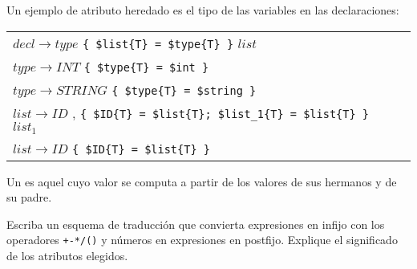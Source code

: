 \begin{example}
\label{example:typesandts}
Un ejemplo de atributo heredado es el tipo de las variables en las declaraciones:

\vspace{0.5cm}
\begin{tabular}{ll}
$decl   \rightarrow type$ \verb|{ $list{T} = $type{T} }| $list$\\
$type   \rightarrow INT$ \verb|{ $type{T} = $int }|\\
$type   \rightarrow STRING$ \verb|{ $type{T} = $string }|\\
$list   \rightarrow ID$ , \verb|{ $ID{T} = $list{T}; $list_1{T} = $list{T} }| $list_1$\\
$list   \rightarrow ID$ \verb|{ $ID{T} = $list{T} }|
\end{tabular}
\vspace{0.5cm}
\end{example}

\begin{definition}
Un  es aquel cuyo valor se computa a partir de los
valores de sus hermanos y de su padre.
\end{definition}

\begin{exercise}
Escriba un esquema de traducción que convierta expresiones en infijo con los 
operadores \verb|+-*/()| y números en expresiones en postfijo. Explique el significado
de los atributos elegidos.
\end{exercise}

